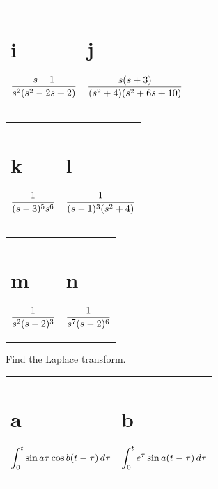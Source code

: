 \begin{exerciselist}
\begin{description}
    \item
      \begin{tabular}[t]{@{}p{168pt}@{}p{168pt}}
        \part{i} $\displaystyle\frac{s-1}{s^{2}(s^{2}-2s+2)}$ & \part{j} $\displaystyle\frac{s(s+3)}{(s^{2}+4)(s^{2}+6s+10)}$
      \end{tabular}

    \item
      \begin{tabular}[t]{@{}p{168pt}@{}p{168pt}}
        \part{k} $\displaystyle\frac{1}{(s-3)^{5}s^{6}}$ & \part{l} $\displaystyle\frac{1}{(s-1)^{3}(s^{2}+4)}$
      \end{tabular}

    \item
      \begin{tabular}[t]{@{}p{168pt}@{}p{168pt}}
        \part{m} $\displaystyle\frac{1}{s^{2}(s-2)^{3}}$ & \part{n} $\displaystyle\frac{1}{s^{7}(s-2)^{6}}$
      \end{tabular}
  \end{description}

  \item\label{exer:8.6.2} Find the Laplace transform.

  \begin{description}
    \item
      \begin{tabular}[t]{@{}p{168pt}@{}p{168pt}}
        \part{a} $\displaystyle{\int_{0}^{t}\sin a\tau\cos b(t-\tau)\,d\tau}$ & \part{b} $\displaystyle{\int_{0}^{t}e^{\tau}\sin a(t-\tau)\,d\tau}$
      \end{tabular}


\end{description}
\end{exerciselist}
